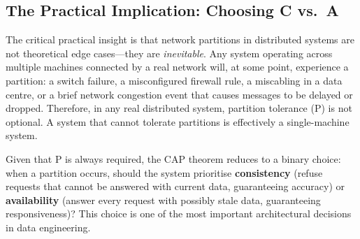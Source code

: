 \subsection{The Practical Implication: Choosing C vs.\ A}
\label{subsec:cap-practice}

The critical practical insight is that network partitions in distributed
systems are not theoretical edge cases---they are \emph{inevitable}. Any
system operating across multiple machines connected by a real network
will, at some point, experience a partition: a switch failure, a
misconfigured firewall rule, a miscabling in a data centre, or a brief
network congestion event that causes messages to be delayed or dropped.
Therefore, in any real distributed system, partition tolerance (P) is
not optional. A system that cannot tolerate partitions is effectively a
single-machine system.

Given that P is always required, the CAP theorem reduces to a binary
choice: when a partition occurs, should the system prioritise
\textbf{consistency} (refuse requests that cannot be answered with
current data, guaranteeing accuracy) or \textbf{availability} (answer
every request with possibly stale data, guaranteeing responsiveness)?
This choice is one of the most important architectural decisions in data
engineering.


